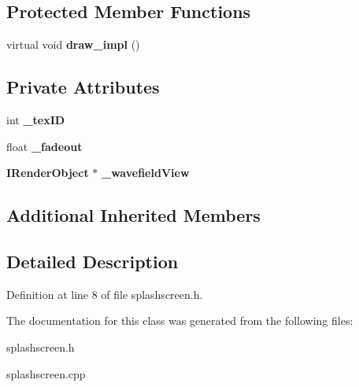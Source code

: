 \subsection*{Protected Member Functions}
\begin{DoxyCompactItemize}
\item 
virtual void {\bfseries draw\-\_\-impl} ()\label{classSoundfieldViewer_1_1SplashScreen_a62ac322bcc0511391548f0fd4ea7da53}

\end{DoxyCompactItemize}
\subsection*{Private Attributes}
\begin{DoxyCompactItemize}
\item 
int {\bfseries \-\_\-tex\-I\-D}\label{classSoundfieldViewer_1_1SplashScreen_a2509a550fffdbd1c20096ff5a66a144b}

\item 
float {\bfseries \-\_\-fadeout}\label{classSoundfieldViewer_1_1SplashScreen_a7c002ca8aaf61e41e4ed9d7f6752179a}

\item 
{\bf I\-Render\-Object} $\ast$ {\bfseries \-\_\-wavefield\-View}\label{classSoundfieldViewer_1_1SplashScreen_a983685ed38c41a08670871206859ab3a}

\end{DoxyCompactItemize}
\subsection*{Additional Inherited Members}


\subsection{Detailed Description}


Definition at line 8 of file splashscreen.\-h.



The documentation for this class was generated from the following files\-:\begin{DoxyCompactItemize}
\item 
splashscreen.\-h\item 
splashscreen.\-cpp\end{DoxyCompactItemize}
